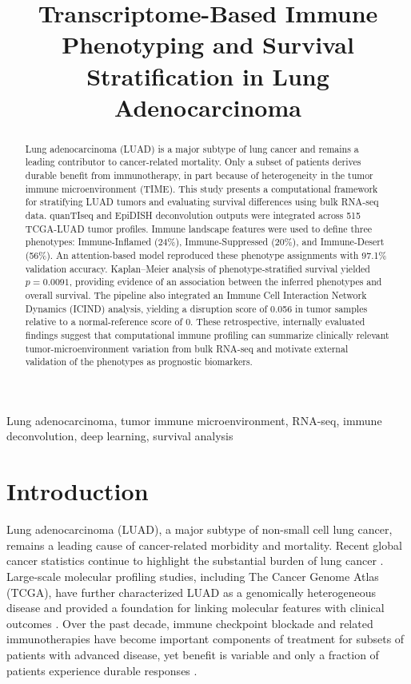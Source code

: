 \documentclass[conference]{IEEEtran}
\title{Transcriptome-Based Immune Phenotyping and Survival Stratification in Lung Adenocarcinoma}
\author{%
\IEEEauthorblockN{Jayaditya Vetsa}
\IEEEauthorblockA{Independent Researcher \\
Email: \texttt{vetsajayaditya@gmail.com}}
\and
\IEEEauthorblockN{Sai Venkat Veerapaneni}
\IEEEauthorblockA{Independent Researcher \\
Email: \texttt{saivenkatveerapaneni@gmail.com}}
}
\begin{document}
\maketitle

\begin{abstract}
Lung adenocarcinoma (LUAD) is a major subtype of lung cancer and remains a leading contributor to cancer-related mortality. Only a subset of patients derives durable benefit from immunotherapy, in part because of heterogeneity in the tumor immune microenvironment (TIME). This study presents a computational framework for stratifying LUAD tumors and evaluating survival differences using bulk RNA-seq data. quanTIseq and EpiDISH deconvolution outputs were integrated across 515 TCGA-LUAD tumor profiles. Immune landscape features were used to define three phenotypes: Immune-Inflamed (24\%), Immune-Suppressed (20\%), and Immune-Desert (56\%). An attention-based model reproduced these phenotype assignments with 97.1\% validation accuracy. Kaplan--Meier analysis of phenotype-stratified survival yielded $p=0.0091$, providing evidence of an association between the inferred phenotypes and overall survival. The pipeline also integrated an Immune Cell Interaction Network Dynamics (ICIND) analysis, yielding a disruption score of 0.056 in tumor samples relative to a normal-reference score of 0. These retrospective, internally evaluated findings suggest that computational immune profiling can summarize clinically relevant tumor-microenvironment variation from bulk RNA-seq and motivate external validation of the phenotypes as prognostic biomarkers.
\end{abstract}

\begin{IEEEkeywords}
Lung adenocarcinoma, tumor immune microenvironment, RNA-seq, immune deconvolution, deep learning, survival analysis
\end{IEEEkeywords}

\section{Introduction}
Lung adenocarcinoma (LUAD), a major subtype of non-small cell lung cancer, remains a leading cause of cancer-related morbidity and mortality.
Recent global cancer statistics continue to highlight the substantial burden of lung cancer \cite{Sung2021}.
Large-scale molecular profiling studies, including The Cancer Genome Atlas (TCGA), have further characterized LUAD as a genomically heterogeneous disease and provided a foundation for linking molecular features with clinical outcomes \cite{TCGA_LUAD_2014}.
Over the past decade, immune checkpoint blockade and related immunotherapies have become important components of treatment for subsets of patients with advanced disease, yet benefit is variable and only a fraction of patients experience durable responses \cite{Pardoll2012,SharmaAllison2015,Herbst2018}.
\end{document}

